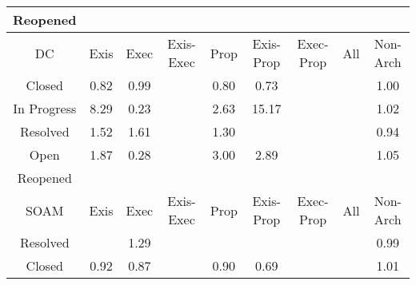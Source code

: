\begin{tabular}{|c||c|c|c|c|c|c|c|c|}
\hline
Reopened &  &  &  &  &  &  &  &  \\ 
\hline
\hline
DC & Exis & Exec & Exis-Exec & Prop & Exis-Prop & Exec-Prop & All & Non-Arch \\ 
\hline
Closed & \cellcolor[rgb]{0.8772166186080996,0.6848253280783378,0.38940217736755955} 0.82 & \cellcolor[rgb]{0.9084390571770407,0.832611537304659,0.4185431200319046} 0.99 &  & \cellcolor[rgb]{0.8741412564708113,0.67026861396184,0.3865318393727572} 0.80 & \cellcolor[rgb]{0.8596783776170462,0.6018109873873523,0.3730331524425765} 0.73 &  &  & \cellcolor[rgb]{0.9099887326917068,0.8399946628539663,0.42} 1.00 \\ 
\hline
In Progress & \cellcolor[rgb]{0.8735734248814209,0.8227453065227782,0.42} 8.29 & \cellcolor[rgb]{0.7679023507898184,0.16740446040514012,0.2873755274038305} 0.23 &  & \cellcolor[rgb]{0.9018747773646858,0.8361512103306407,0.42} 2.63 & \cellcolor[rgb]{0.8391549354963885,0.8064418115509209,0.42} 15.17 &  &  & \cellcolor[rgb]{0.9098954051929208,0.8399504550913836,0.42} 1.02 \\ 
\hline
Resolved & \cellcolor[rgb]{0.9074130822389033,0.8387746179026384,0.42} 1.52 & \cellcolor[rgb]{0.9069742070657164,0.8385667296627076,0.42} 1.61 &  & \cellcolor[rgb]{0.9085032970109123,0.8392910354262215,0.42} 1.30 &  &  &  & \cellcolor[rgb]{0.8996579680091735,0.7910477152434213,0.41034743680856195} 0.94 \\ 
\hline
Open & \cellcolor[rgb]{0.905651004185371,0.8379399493509652,0.42} 1.87 & \cellcolor[rgb]{0.7776830360613759,0.2136997040238458,0.2965041669906175} 0.28 &  & \cellcolor[rgb]{0.900017961426532,0.8352716659388836,0.42} 3.00 & \cellcolor[rgb]{0.9005691831557497,0.835532770968513,0.42} 2.89 &  &  & \cellcolor[rgb]{0.9097361240657095,0.8398750061363887,0.42} 1.05 \\ 
\hline
Reopened &  &  &  &  &  &  &  &  \\ 
\hline
\hline
SOAM & Exis & Exec & Exis-Exec & Prop & Exis-Prop & Exec-Prop & All & Non-Arch \\ 
\hline
Resolved &  & \cellcolor[rgb]{0.9085457363175325,0.8393111382556733,0.42} 1.29 &  &  &  &  &  & \cellcolor[rgb]{0.9076169017710425,0.8287200017162677,0.4177757749863063} 0.99 \\ 
\hline
Closed & \cellcolor[rgb]{0.8950537003831993,0.7692541818138098,0.40605012035765264} 0.92 & \cellcolor[rgb]{0.886150608782682,0.7271128815713616,0.39774056819716985} 0.87 &  & \cellcolor[rgb]{0.8908464850052095,0.7493400290246579,0.40212338600486214} 0.90 & \cellcolor[rgb]{0.8532167106493744,0.5712257637403727,0.36700226327274954} 0.69 &  &  & \cellcolor[rgb]{0.909965613671974,0.8399837117393559,0.42} 1.01 \\ 

\end{tabular}
